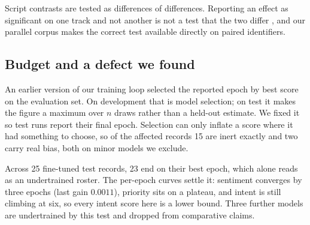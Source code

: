 Script contrasts are tested as differences of differences. Reporting an effect
as significant on one track and not another is not a test that the two differ
\cite{gelman2006significant}, and our parallel corpus makes the correct test
available directly on paired identifiers.

\subsection{Budget and a defect we found}

An earlier version of our training loop selected the reported epoch by best
score on the evaluation set. On development that is model selection; on test it
makes the figure a maximum over $n$ draws rather than a held-out estimate. We
fixed it so test runs report their final epoch. Selection can only inflate a
score where it had something to choose, so of the affected records 15 are inert
exactly and two carry real bias, both on minor models we exclude.

Across 25 fine-tuned test records, 23 end on their best epoch, which alone reads
as an undertrained roster. The per-epoch curves settle it: sentiment converges
by three epochs (last gain $0.0011$), priority sits on a plateau, and intent is
still climbing at six, so every intent score here is a lower bound. Three
further models are undertrained by this test and dropped from comparative
claims.
